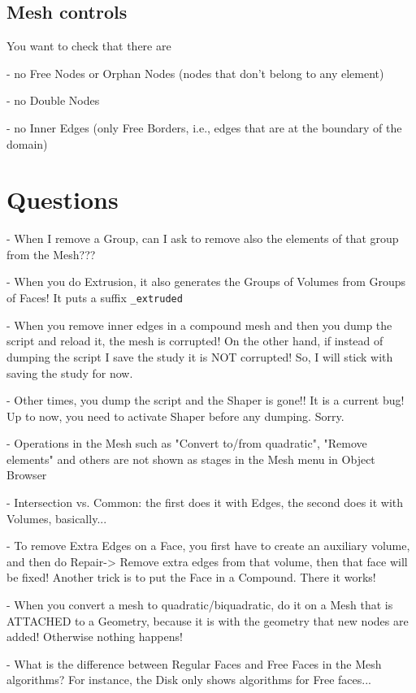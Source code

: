\documentclass[10pt]{book}
\begin{document}
 \section{Mesh controls}
 
  You want to check that there are 
  
  - no Free Nodes or Orphan Nodes (nodes that don't belong to any element)
  
  - no Double Nodes
  
  - no Inner Edges (only Free Borders, i.e., edges that are at the boundary of the domain)
  
  

 

 \chapter{Questions}


- When I remove a Group, can I ask to remove also the elements of that group from the Mesh???

- When you do Extrusion, it also generates the Groups of Volumes from Groups of Faces! It puts a suffix \verb|_extruded|

- When you remove inner edges in a compound mesh and then you dump the script and reload it, the mesh is corrupted! 
On the other hand, if instead of dumping the script I save the study it is NOT corrupted! So, I will stick with saving the study for now.

- Other times, you dump the script and the Shaper is gone!! It is a current bug! Up to now, you need to activate Shaper before any dumping. Sorry.

- Operations in the Mesh such as "Convert to/from quadratic", "Remove elements" and others
  are not shown as stages in the Mesh menu in Object Browser

- Intersection vs. Common: the first does it with Edges, the second does it with Volumes, basically...

- To remove Extra Edges on a Face, you first have to create an auxiliary volume, and then do Repair-> Remove extra edges from that volume,
  then that face will be fixed!
  Another trick is to put the Face in a Compound. There it works!

- When you convert a mesh to quadratic/biquadratic, do it on a Mesh that is ATTACHED to a Geometry, because it is with the geometry that new nodes are added! 
  Otherwise nothing happens!

- What is the difference between Regular Faces and Free Faces in the Mesh algorithms? For instance, the Disk only shows algorithms for Free faces...
\end{document}
